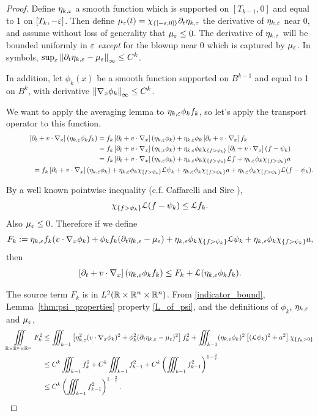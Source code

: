 \begin{proof}
\newcommand{\etak}{\eta_{k,\eps}}

Define $\etak$ a smooth function which is supported on $[T_{k-1},0]$ and equal to 1 on $[T_k, -\varepsilon]$.  Then define $\mu_\eps(t) = \indic{[-\eps,0]}\del_t \etak$ the derivative of $\etak$ near 0, and assume without loss of generality that $\mu_\varepsilon \leq 0$.  The derivative of $\etak$ will be bounded uniformly in $\varepsilon$ \emph{except} for the blowup near 0 which is captured by $\mu_\varepsilon$.  In symbols, $\sup_\eps \norm{\del_t \etak - \mu_\eps}_\infty \leq C^k$.  

In addition, let $\phi_k(x)$ be a smooth function supported on $B^{k-1}$ and equal to 1 on $B^k$, with derivative $\left\lVert\nabla_x \phi_k\right\rVert_\infty \leq C^k$.  


We want to apply the averaging lemma to $\etak \phi_k f_k$, so let's apply the transport operator to this function.  
\begin{gather*}
\begin{aligned}
\kinet (\etak \phi_k f_k) &= f_k \kinet (\etak\phi_k) + \etak\phi_k \kinet f_k
\\ &= f_k \kinet (\etak \phi_k) + \etak \phi_k \indic{f > \psi_k} \kinet (f - \psi_k)
\\ &= f_k \kinet (\etak \phi_k) + \etak \phi_k \indic{f > \psi_k} \L f + \etak \phi_k \indic{f > \psi_k} a
\end{aligned}
\\ \qquad \quad \quad
= f_k \kinet (\etak \phi_k) + \etak \phi_k \indic{f > \psi_k} \L \psi_k + \etak \phi_k \indic{f > \psi_k} a + \etak \phi_k \indic{f > \psi_k} \L (f - \psi_k).
\end{gather*}

By a well known pointwise inequality (c.f. Caffarelli and Sire \cite{CaSi.pointwise}),
\[ \chi_{\{f > \psi_k\}} \mathcal{L} (f - \psi_k) \leq \mathcal{L} f_k. \]
Also $\mu_\varepsilon \leq 0$.  Therefore if we define
\[ F_k := \etak f_k (v\cdot\grad_x \phi_k) + \phi_k f_k (\del_t \etak - \mu_\eps) + \etak \phi_k \indic{f > \psi_k} \L \psi_k + \etak \phi_k \indic{f > \psi_k} a, \]
then
\[ \kinet ( \etak \phi_k f_k) \leq F_k + \L(\etak \phi_k f_k). \]

The source term $F_k$ is in $L^2(\mathbb{R}\times\mathbb{R}^n\times\mathbb{R}^n)$.  From \eqref{indicator_bound}, Lemma~\ref{thm:psi_properties} property \eqref{L_of_psi}, and the definitions of $\phi_k$, $\etak$ and $\mu_\varepsilon$, 
\begin{align}
\iiint\displaylimits_{\Rall} F_k^2 &\leq \iiint_{k-1} \bracket{\etak^2 (v\cdot\grad_x\phi_k)^2 + \phi_k^2 (\del_t \etak - \mu_\eps)^2} f_k^2 + \iiint_{k-1} (\etak \phi_k)^2 \bracket{(\L \psi_k)^2 + a^2} \indic{f_k > 0} \nonumber
\\ &\leq C^k \iiint_{k-1} f_k^2 + C^k \iiint_{k-1} f_{k-1}^2 + C^k \paren{\iiint_{k-1} f_{k-1}^2}^{1-\frac{2}{\sourceexp}} \nonumber
\\ &\leq C^k \paren{\iiint_{k-1} f_{k-1}^2 }^{1-\frac{2}{\sourceexp}}. \label{Fk_bound}
\end{align}


\end{proof}
